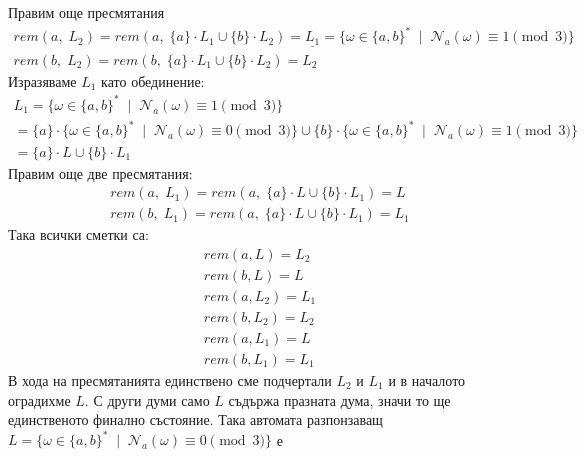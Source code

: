 \documentclass[12pt]{article}
\begin{document}
\vspace{2mm}
Правим още пресмятания
\begin{align*}
    rem(a, \; L_2) = rem(a, \; \{a\} \cdot L_1 \cup \{b\} \cdot L_2) = \underline{L_1} = \{\omega \in \{a, b\}^* \; \mid \; \mathcal{N}_{a}(\omega) \equiv 1 \pmod{3}\} \\
    rem(b, \; L_2) = rem(b, \; \{a\} \cdot L_1 \cup \{b\} \cdot L_2) = L_2
\end{align*}
Изразяваме \(L_1\) като обединение:
\begin{align*}
    L_1 = \{\omega \in \{a, b\}^* \; \mid \; \mathcal{N}_{a}(\omega) \equiv 1 \pmod{3}\} \\
= \{a\} \cdot \{\omega \in \{a, b\}^* \; \mid \; \mathcal{N}_{a}(\omega) \equiv 0 \pmod{3}\} 
\cup \{b\} \cdot \{\omega \in \{a, b\}^* \; \mid \; \mathcal{N}_{a}(\omega) \equiv 1 \pmod{3}\} \\
= \{a\} \cdot L \cup \{b\} \cdot L_1
\end{align*}
Правим още две пресмятания:
\begin{align*}
    rem(a, \; L_1) = rem(a, \; \{a\} \cdot L \cup \{b\} \cdot L_1) = L \\
    rem(b, \; L_1) = rem(a, \; \{a\} \cdot L \cup \{b\} \cdot L_1) = L_1
\end{align*}
Така всички сметки са:
\begin{align*}
    rem(a, L) = L_2 \\
    rem(b, L) = L \\
    rem(a, L_2) = L_1 \\
    rem(b, L_2) = L_2 \\
    rem(a, L_1) = L \\
    rem(b, L_1) = L_1
\end{align*}
В хода на пресмятанията единствено сме подчертали \(L_2\) и \(L_1\) и в началото оградихме \(L\).
С други думи само \(L\) съдържа празната дума, значи то ще единственото финално състояние.
Така автомата разпонзаващ \\
\(L = \{\omega \in \{a, b\}^* \; \mid \; \mathcal{N}_{a}(\omega) \equiv 0 \pmod{3}\}\) е

\begin{center}
\end{center}
\end{document}
